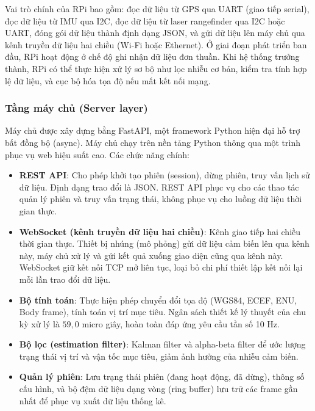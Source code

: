 Vai trò chính của RPi bao gồm: đọc dữ liệu từ GPS qua UART (giao tiếp serial), đọc dữ liệu từ IMU qua I2C, đọc dữ liệu từ laser rangefinder qua I2C hoặc UART, đóng gói dữ liệu thành định dạng JSON, và gửi dữ liệu lên máy chủ qua kênh truyền dữ liệu hai chiều (Wi-Fi hoặc Ethernet). Ở giai đoạn phát triển ban đầu, RPi hoạt động ở chế độ ghi nhận dữ liệu đơn thuần. Khi hệ thống trưởng thành, RPi có thể thực hiện xử lý sơ bộ như lọc nhiễu cơ bản, kiểm tra tính hợp lệ dữ liệu, và cục bộ hóa tọa độ nếu mất kết nối mạng.

\subsubsection{Tầng máy chủ (Server layer)}

\hspace{0.5cm} Máy chủ được xây dựng bằng FastAPI, một framework Python hiện đại hỗ trợ bất đồng bộ (async). Máy chủ chạy trên nền tảng Python thông qua một trình phục vụ web hiệu suất cao. Các chức năng chính:

\begin{itemize}
    \item \textbf{REST API}: Cho phép khởi tạo phiên (session), dừng phiên, truy vấn lịch sử dữ liệu. Định dạng trao đổi là JSON. REST API phục vụ cho các thao tác quản lý phiên và truy vấn trạng thái, không phục vụ cho luồng dữ liệu thời gian thực.
    \item \textbf{WebSocket (kênh truyền dữ liệu hai chiều)}: Kênh giao tiếp hai chiều thời gian thực. Thiết bị nhúng (mô phỏng) gửi dữ liệu cảm biến lên qua kênh này, máy chủ xử lý và gửi kết quả xuống giao diện cũng qua kênh này. WebSocket giữ kết nối TCP mở liên tục, loại bỏ chi phí thiết lập kết nối lại mỗi lần trao đổi dữ liệu.
    \item \textbf{Bộ tính toán}: Thực hiện phép chuyển đổi tọa độ (WGS84, ECEF, ENU, Body frame), tính toán vị trí mục tiêu. Ngân sách thiết kế lý thuyết của chu kỳ xử lý là $59{,}0$ micro giây, hoàn toàn đáp ứng yêu cầu tần số 10 Hz.
    \item \textbf{Bộ lọc (estimation filter)}: Kalman filter và alpha-beta filter để ước lượng trạng thái vị trí và vận tốc mục tiêu, giảm ảnh hưởng của nhiễu cảm biến.
    \item \textbf{Quản lý phiên}: Lưu trạng thái phiên (đang hoạt động, đã dừng), thông số cấu hình, và bộ đệm dữ liệu dạng vòng (ring buffer) lưu trữ các frame gần nhất để phục vụ xuất dữ liệu thống kê.
\end{itemize}

